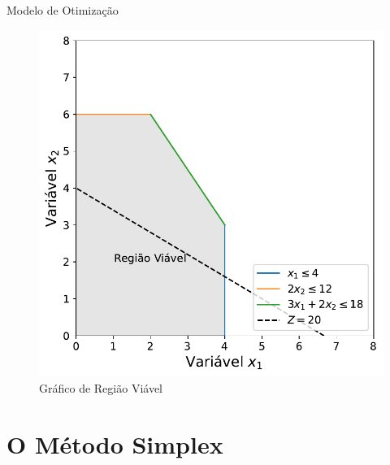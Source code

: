 \documentclass{if-beamer}
\begin{document}
\begin{frame}{Modelo de Otimização}
\begin{minipage}{.49\textwidth}
\begin{figure}
    \centering
    \includegraphics[scale=.45]{figuras/fig_wyndor_Z.pdf}
    \caption{Gráfico de Região Viável}
\end{figure}

\end{minipage}

\end{frame}


\section{O Método Simplex}

\end{document}

